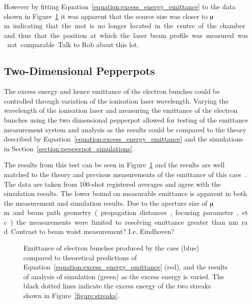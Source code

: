 However by fitting Equation~\ref{equation:excess_energy_emittance} to the data shown in Figure~\ref{figure:emittance_vs_theory} it was apparent that the source size was closer to \unit[340]{$\muup$m} indicating that the \gls{mot} is no longer located in the centre of the chamber and thus that the position at which the laser beam profile was measured was not comparable.
{\color{red}Talk to Rob about this lot.}

\subsection{Two-Dimensional Pepperpots}
The excess energy and hence emittance of the electron bunches could be controlled through variation of the ionisation laser wavelength.
Varying the wavelength of the ionisation laser and measuring the emittance of the electron bunches using the two dimensional pepperpot allowed for testing of the emittance measurement system and analysis as the results could be compared to the theory described by Equation~\ref{equation:excess_energy_emittance} and the simulations in Section~\ref{section:pepperpot_simulations}.

The results from this test can be seen in Figure~\ref{figure:emittance_vs_theory} and the results are well matched to the theory and previous measurements of the emittance of this \gls{caes}~\cite{mcculloch_high-coherence_2013}.
The data are taken from 100-shot registered averages and agree with the simulation results.
The lower bound on measurable emittance is apparent in both the measurement and simulation results.
Due to the aperture size of \unit[50]{$\muup$m} and beam path geometry (propagation distances, focusing parameter, etc.) the measurements were limited to resolving emittance greater than \unit[41]{nm rad}.
{\color{red}Contrast to beam waist measurement? I.e. Eindhoven?}

\begin{figure}
    \center
    
    \caption[Measured emittance compared with theory and simulation.]{Emittance of electron bunches produced by the \gls{caes} (blue) compared to theoretical predictions of Equation~\ref{equation:excess_energy_emittance} (red), and the results of analysis of simulation (green) as the excess energy is varied. The black dotted lines indicate the excess energy of the two streaks shown in Figure~\ref{figure:streaks}.}
    \label{figure:emittance_vs_theory}
\end{figure}


